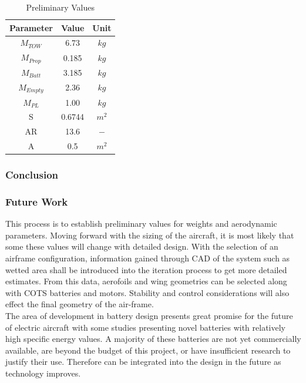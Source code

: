 \begin{table}[H]
\centering
\caption{Preliminary Values}
\label{tab:preresults}
\begin{tabular}{|c|c|c|}
\hline
Parameter & Value & Unit \\ \hline\hline
$M_{TOW}$ & 6.73 & $kg$ \\ \hline
$M_{Prop}$ & 0.185 & $kg$ \\ \hline
$M_{Batt}$ & 3.185 & $kg$ \\ \hline
$M_{Empty}$ & 2.36 & $kg$ \\ \hline
$M_{PL}$ & 1.00 & $kg$ \\ \hline
S & 0.6744 & $m^2$ \\ \hline
AR & 13.6 & $-$ \\ \hline
A & 0.5 & $m^2$ \\ \hline
\end{tabular}%
\end{table}

\subsubsection{Conclusion}



\subsubsection{Future Work}
This process is to establish preliminary values for weights and aerodynamic parameters. Moving forward with the sizing of the aircraft, it is most likely that some these values will change with detailed design. With the selection of an airframe configuration, information gained through CAD of the system such as wetted area shall be introduced into the iteration process to get more detailed estimates. From this data, aerofoils and wing geometries can be selected along with COTS batteries and motors. Stability and control considerations will also effect the final geometry of the air-frame. \\

The area of development in battery design presents great promise for the future of electric aircraft with some studies presenting novel batteries with relatively high specific energy values. A majority of these batteries are not yet commercially available, are beyond the budget of this project, or have insufficient research to justify their use. Therefore can be integrated into the design in the future as technology improves.